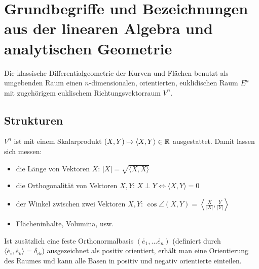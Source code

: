 \chapter{Grundbegriffe und Bezeichnungen aus der linearen Algebra und analytischen Geometrie}
  
  Die klassische Differentialgeometrie der Kurven und Flächen benutzt als umgebenden Raum einen \(n\)-dimensionalen, orientierten, euklidischen Raum \(E^n\) mit zugehörigem euklischem Richtungsvektorraum \(V^n\).

\section{Strukturen}
\(V^n\) ist mit einem Skalarprodukt \((X,Y) \mapsto \langle X, Y \rangle \in \mathbb{R}\) ausgestattet. 
Damit lassen sich messen:
  \begin{itemize}
   \item die Länge von Vektoren \(X\): \(|X| = \sqrt{ \langle X,X \rangle }\)
   \item die Orthogonalität von Vektoren \(X, Y\): \(X \perp Y \Leftrightarrow \langle X, Y \rangle = 0\)
   \item der Winkel zwischen zwei Vektoren \(X, Y\): \(\cos \angle (X, Y) = \left\langle \frac{X}{|X|}, \frac{Y}{|Y|} \right\rangle \)
   \item Flächeninhalte, Volumina, usw.
  \end{itemize}
Ist zusätzlich eine feste Orthonormalbasis \( (\mathring{e_1}, ... \mathring{e_n}) \) (definiert durch \( \langle \mathring{e_i}, \mathring{e_k} \rangle = \delta_{ik} \)) ausgezeichnet als positiv orientiert, erhält man eine Orientierung des Raumes und kann alle Basen in positiv und negativ orientierte einteilen.
  
